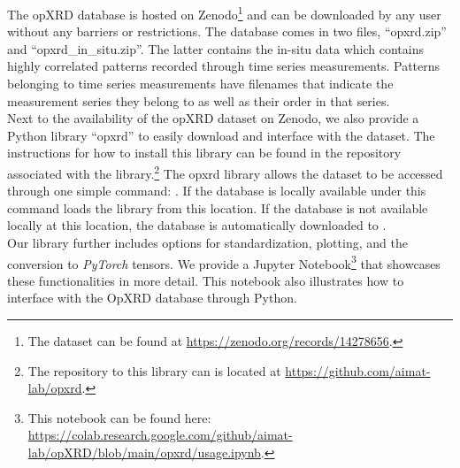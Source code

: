 The opXRD database is hosted on Zenodo\footnote{The dataset can be found at \url{https://zenodo.org/records/14278656}.} and can be downloaded by any user without any barriers or restrictions. The database comes in two files, ``opxrd.zip'' and ``opxrd\_in\_situ.zip''. The latter contains the in-situ data which contains highly correlated patterns recorded through time series measurements. Patterns belonging to time series measurements have filenames that indicate the measurement series they belong to as well as their order in that series. \\

Next to the availability of the opXRD dataset on Zenodo, we also provide a Python library ``opxrd'' to easily download and interface with the dataset. The instructions for how to install this library can be found in the repository associated with the library.\footnote{The repository to this library can is located at \url{https://github.com/aimat-lab/opxrd}.} The opxrd library allows the dataset to be accessed through one simple command: . If the database is locally available under  this command loads the library from this location. If the database is not available locally at this location, the database is automatically downloaded to . \\

Our library further includes options for standardization, plotting, and the conversion to \emph{PyTorch} tensors. We provide a Jupyter Notebook\footnote{This notebook can be found here: \url{https://colab.research.google.com/github/aimat-lab/opXRD/blob/main/opxrd/usage.ipynb}.} that showcases these functionalities in more detail. This notebook also illustrates how to interface with the OpXRD database through Python. 